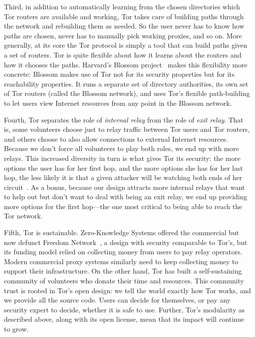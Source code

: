 \documentclass{llncs}
\begin{document}
Third, in addition to automatically learning from the chosen directories
which Tor routers are available and working, Tor takes care of building
paths through the network and rebuilding them as needed. So the user
never has to know how paths are chosen, never has to manually pick
working proxies, and so on. More generally, at its core the Tor protocol
is simply a tool that can build paths given a set of routers. Tor is
quite flexible about how it learns about the routers and how it chooses
the paths. Harvard's Blossom project~\cite{blossom-thesis} makes this
flexibility more concrete: Blossom makes use of Tor not for its security
properties but for its reachability properties. It runs a separate set
of directory authorities, its own set of Tor routers (called the Blossom
network), and uses Tor's flexible path-building to let users view Internet
resources from any point in the Blossom network.

Fourth, Tor separates the role of \emph{internal relay} from the
role of \emph{exit relay}. That is, some volunteers choose just to relay
traffic between Tor users and Tor routers, and others choose to also allow
connections to external Internet resources. Because we don't force all
volunteers to play both roles, we end up with more relays. This increased
diversity in turn is what gives Tor its security: the more options the
user has for her first hop, and the more options she has for her last hop,
the less likely it is that a given attacker will be watching both ends
of her circuit~\cite{tor-design}. As a bonus, because our design attracts
more internal relays that want to help out but don't want to deal with
being an exit relay, we end up providing more options for the first
hop---the one most critical to being able to reach the Tor network.

Fifth, Tor is sustainable. Zero-Knowledge Systems offered the commercial
but now defunct Freedom Network~\cite{freedom21-security}, a design with
security comparable to Tor's, but its funding model relied on collecting
money from users to pay relay operators. Modern commercial proxy systems
similarly
need to keep collecting money to support their infrastructure. On the
other hand, Tor has built a self-sustaining community of volunteers who
donate their time and resources. This community trust is rooted in Tor's
open design: we tell the world exactly how Tor works, and we provide all
the source code. Users can decide for themselves, or pay any security
expert to decide, whether it is safe to use. Further, Tor's modularity
as described above, along with its open license, mean that its impact
will continue to grow.
\end{document}
